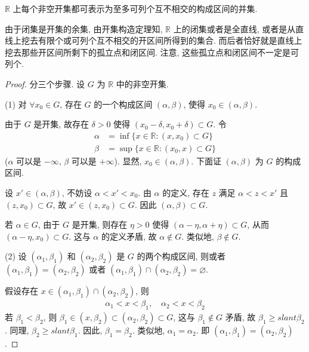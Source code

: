 \documentclass[../../main.tex]{subfiles}
\begin{document}
\begin{theorem}[开集构造定理]\label{theorem:开集构造定理}
$\mathbb{R}$ 上每个非空开集都可表示为至多可列个互不相交的构成区间的并集.
\end{theorem}
\begin{note}
由于闭集是开集的余集, 由开集构造定理知, $\mathbb{R}$ 上的闭集或者是全直线, 或者是从直线上挖去有限个或可列个互不相交的开区间所得到的集合. 而后者恰好就是直线上挖去那些开区间所剩下的孤立点和闭区间. 注意, 这些孤立点和闭区间不一定是可列个. 
\end{note}
\begin{proof}
分三个步骤. 设 $G$ 为 $\mathbb{R}$ 中的非空开集.

(1) 对 $\forall x_0 \in G$, 存在 $G$ 的一个构成区间 $(\alpha, \beta)$, 使得 $x_0 \in (\alpha, \beta)$.

由于 $G$ 是开集, 故存在 $\delta > 0$ 使得 $(x_0 - \delta, x_0 + \delta) \subset G$. 令
\begin{align*}
\alpha &= \inf\{x \in \mathbb{R} : (x, x_0) \subset G\}\\
\beta &= \sup\{x \in \mathbb{R} : (x_0, x) \subset G\}
\end{align*}
($\alpha$ 可以是 $-\infty$, $\beta$ 可以是 $+\infty$). 显然, $x_0 \in (\alpha, \beta)$. 下面证 $(\alpha, \beta)$ 为 $G$ 的构成区间.

设 $x' \in (\alpha, \beta)$, 不妨设 $\alpha < x' < x_0$. 由 $\alpha$ 的定义, 存在 $z$ 满足 $\alpha < z < x'$ 且 $(z, x_0) \subset G$, 故 $x' \in (z, x_0) \subset G$. 因此 $(\alpha, \beta) \subset G$.

若 $\alpha \in G$, 由于 $G$ 是开集, 则存在 $\eta > 0$ 使得 $(\alpha - \eta, \alpha + \eta) \subset G$, 从而 $(\alpha - \eta, x_0) \subset G$. 这与 $\alpha$ 的定义矛盾, 故 $\alpha \notin G$. 类似地, $\beta \notin G$.

(2) 设 $(\alpha_1, \beta_1)$ 和 $(\alpha_2, \beta_2)$ 是 $G$ 的两个构成区间, 则或者 $(\alpha_1, \beta_1) = (\alpha_2, \beta_2)$ 或者 $(\alpha_1, \beta_1) \cap (\alpha_2, \beta_2) = \varnothing$.

假设存在 $x \in (\alpha_1, \beta_1) \cap (\alpha_2, \beta_2)$, 则
\begin{align*}
\alpha_1 < x < \beta_1, \quad \alpha_2 < x < \beta_2
\end{align*}
若 $\beta_1 < \beta_2$, 则 $\beta_1 \in (x, \beta_2) \subset (\alpha_2, \beta_2) \subset G$, 这与 $\beta_1 \notin G$ 矛盾, 故 $\beta_1 \geqslant slant \beta_2$. 同理, $\beta_2 \geqslant slant \beta_1$. 因此, $\beta_1 = \beta_2$. 类似地, $\alpha_1 = \alpha_2$. 即 $(\alpha_1, \beta_1) = (\alpha_2, \beta_2)$.


\end{proof}
\end{document}
